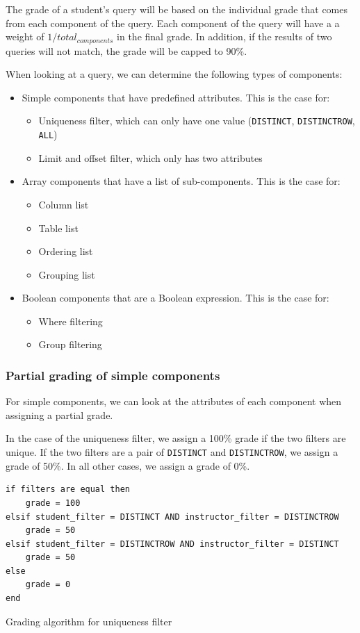 The grade of a student's query will be based on the individual grade that comes from each component of the query. Each component of the query will have a a weight of $1 / total_{components}$  in the final grade. In addition, if the results of two queries will not match, the grade will be capped to 90\%.

When looking at a query, we can determine the following types of components:

\begin{itemize}
    \item Simple components that have predefined attributes. This is the case for:
        \begin{itemize}
            \item Uniqueness filter, which can only have one value (\texttt{DISTINCT}, \texttt{DISTINCTROW}, \texttt{ALL})
            \item Limit and offset filter, which only has two attributes
        \end{itemize}
    \item Array components that have a list of sub-components. This is the case for:
        \begin{itemize}
            \item Column list
            \item Table list
            \item Ordering list
            \item Grouping list
        \end{itemize}
    \item Boolean components that are a Boolean expression. This is the case for:
        \begin{itemize}
            \item Where filtering
            \item Group filtering
        \end{itemize}
\end{itemize}

\subsubsection{Partial grading of simple components}

For simple components, we can look at the attributes of each component when assigning a partial grade.

In the case of the uniqueness filter, we assign a 100\% grade if the two filters are unique. If the two filters are a pair of \texttt{DISTINCT} and \texttt{DISTINCTROW}, we assign a grade of 50\%. In all other cases, we assign a grade of 0\%.
\begin{code}
\begin{verbatim}
if filters are equal then
    grade = 100
elsif student_filter = DISTINCT AND instructor_filter = DISTINCTROW
    grade = 50
elsif student_filter = DISTINCTROW AND instructor_filter = DISTINCT
    grade = 50
else
    grade = 0
end
\end{verbatim}
\caption{Grading algorithm for uniqueness filter}
\end{code}

